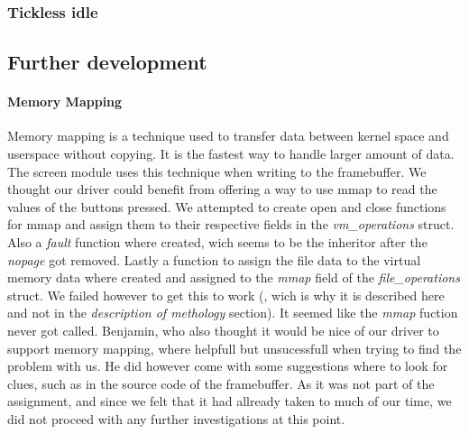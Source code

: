 \subsubsection{Tickless idle}

\subsection{Further development}
\paragraph{Memory Mapping}
Memory mapping is a technique used to transfer data between kernel space and userspace without copying. It is the fastest way to handle larger amount of data. The screen module uses this technique when writing to the framebuffer. We thought our driver could benefit from offering a way to use mmap to read the values of the buttons pressed. We attempted to create open and close functions for mmap and assign them to their respective fields in the \emph{vm\_operations} struct. Also a \emph{fault} function where created, wich seems to be the inheritor after the \emph{nopage} got removed. Lastly a function to assign the file data to the virtual memory data where created and assigned to the \emph{mmap} field of the \emph{file\_operations} struct. We failed however to get this to work (, wich is why it is described here and not in the \emph{description of methology} section). It seemed like the \emph{mmap} fuction never got called. Benjamin, who also thought it would be nice of our driver to support memory mapping, where helpfull but unsucessfull when trying to find the problem with us. He did however come with some suggestions where to look for clues, such as in the source code of the framebuffer. As it was not part of the assignment, and since we felt that it had allready taken to much of our time, we did not proceed with any further investigations at this point.

